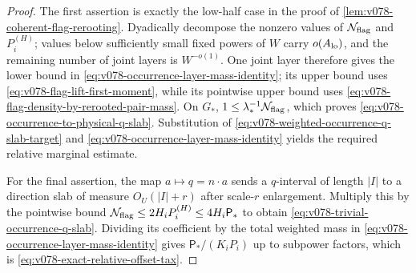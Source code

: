 \documentclass[10pt]{article}
\begin{document}
\begin{proof}
The first assertion is exactly the low-half case in the proof of
\cref{lem:v078-coherent-flag-rerooting}.  Dyadically decompose the nonzero values of
\(\mathcal N_{\rm flag}\) and \(P_i^{(H)}\); values below sufficiently small fixed powers of \(W\)
carry \(o(A_{\rm lo})\), and the remaining number of joint layers is \(W^{-o(1)}\).  One joint
layer therefore gives the lower bound in
\eqref{eq:v078-occurrence-layer-mass-identity}; its upper bound uses
\eqref{eq:v078-flag-lift-first-moment}, while its pointwise upper bound uses
\eqref{eq:v078-flag-density-by-rerooted-pair-mass}.  On \(G_*\),
\(1\le\lambda_*^{-1}\mathcal N_{\rm flag}\), which proves
\eqref{eq:v078-occurrence-to-physical-q-slab}.  Substitution of
\eqref{eq:v078-weighted-occurrence-q-slab-target} and
\eqref{eq:v078-occurrence-layer-mass-identity} yields the required relative marginal estimate.

For the final assertion, the map \(a\mapsto q=n\cdot a\) sends a \(q\)-interval of length
\(|I|\) to a direction slab of measure \(O_U(|I|+r)\) after scale-\(r\) enlargement.  Multiply this
by the pointwise bound
\(\mathcal N_{\rm flag}\le2H_iP_i^{(H)}\le4H_i\mathsf P_*\) to obtain
\eqref{eq:v078-trivial-occurrence-q-slab}.  Dividing its coefficient by the total weighted mass in
\eqref{eq:v078-occurrence-layer-mass-identity} gives
\(\mathsf P_* /(K_iP_i)\) up to subpower factors, which is
\eqref{eq:v078-exact-relative-offset-tax}.
\end{proof}
\end{document}
